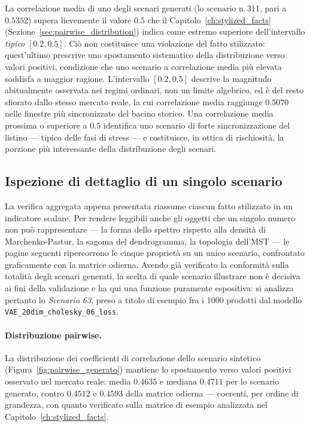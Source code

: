 \begin{osservazione}
La correlazione media di uno degli scenari generati (lo scenario n.\,311, pari a $0.5352$) supera lievemente il valore $0.5$ che il Capitolo~\ref{ch:stylized_facts} (Sezione~\ref{sec:pairwise_distribution}) indica come estremo superiore dell'intervallo \emph{tipico} $[0.2, 0.5]$. Ciò non costituisce una violazione del fatto stilizzato: quest'ultimo prescrive uno spostamento sistematico della distribuzione verso valori positivi, condizione che uno scenario a correlazione media più elevata soddisfa a maggior ragione. L'intervallo $[0.2, 0.5]$ descrive la magnitudo abitualmente osservata nei regimi ordinari, non un limite algebrico, ed è del resto sfiorato dallo stesso mercato reale, la cui correlazione media raggiunge $0.5070$ nelle finestre più sincronizzate del bacino storico. Una correlazione media prossima o superiore a $0.5$ identifica uno scenario di forte sincronizzazione del listino --- tipico delle fasi di stress --- e costituisce, in ottica di rischiosità, la porzione più interessante della distribuzione degli scenari.
\end{osservazione}

\subsection{Ispezione di dettaglio di un singolo scenario}
\label{subsec:verifica_dettaglio}

La verifica aggregata appena presentata riassume ciascun fatto stilizzato in un indicatore scalare. Per rendere leggibili anche gli oggetti che un singolo numero non può rappresentare --- la forma dello spettro rispetto alla densità di Marchenko-Pastur, la sagoma del dendrogramma, la topologia dell'MST --- le pagine seguenti ripercorrono le cinque proprietà su un unico scenario, confrontato graficamente con la matrice odierna. Avendo già verificato la conformità sulla totalità degli scenari generati, la scelta di quale scenario illustrare non è decisiva ai fini della validazione e ha qui una funzione puramente espositiva: si analizza pertanto lo \emph{Scenario 63}, preso a titolo di esempio fra i 1000 prodotti dal modello \texttt{VAE\_20dim\_cholesky\_06\_loss}.

\paragraph{Distribuzione pairwise.} La distribuzione dei coefficienti di correlazione dello scenario sintetico (Figura~\ref{fig:pairwise_generato}) mantiene lo spostamento verso valori positivi osservato nel mercato reale: media $0.4635$ e mediana $0.4711$ per lo scenario generato, contro $0.4512$ e $0.4593$ della matrice odierna --- coerenti, per ordine di grandezza, con quanto verificato sulla matrice di esempio analizzata nel Capitolo~\ref{ch:stylized_facts}.

